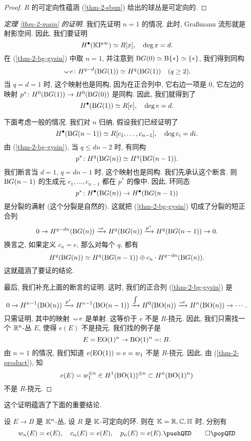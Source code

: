 \begin{proof}
    $R$ 的可定向性蕴涵 (\ref{thm-2-sbun}) 给出的球丛是可定向的.
\end{proof}

\begin{proof}[定理 \ref{thm-2-main} 的证明]
    我们先证明 $n = 1$ 的情况. 此时, Graßmann 流形就是射影空间. 因此, 我们要证明
    \[ H^\bullet (\mathbb{K} \mathrm{P}^\infty) \simeq R[x], \quad \deg x = d. \]
    在 (\ref{thm-2-bg-gysin}) 中取 $n = 1$,
    并注意到 $\mathrm{B} G(0) \simeq \mathrm{B} \{*\} \simeq \{*\}$, 我们得到同构
    \[ {} \smallcup e \: H^{q - d} (\upB G(1)) \simeq H^q (\upB G(1)) 
        \quad (q \geq 2). \]
    当 $q = d = 1$ 时, 这个映射也是同构,
    因为在正合列中, 它右边一项是 $0$,
    它左边的映射 $p^* \colon H^0(\mathrm{B} G(1)) \to H^0(\mathrm{B} G(0))$ 是同构.
    因此, 我们就得到了
    \[ H^\bullet(\mathrm{B} G(1)) \simeq R[e], \quad \deg e = d. \]

    下面考虑一般的情况. 我们对 $n$ 归纳, 假设我们已经证明了
    \[ H^\bullet (\mathrm{B} G(n-1)) \simeq R[c_1, \dotsc, c_{n-1}], \quad \deg c_i = di. \]
    由 (\ref{thm-2-bg-gysin}), 当 $q \leq dn - 2$ 时, 有同构
    \[ p^* \colon H^q (\mathrm{B} G(n)) \simeq H^q (\mathrm{B} G(n-1)). \]
    我们断言当 $d = 1$, $q = dn - 1$ 时, 这个映射也是同构.
    我们先承认这个断言. 则 $\mathrm{B} G(n-1)$ 的生成元 $c_1, \dotsc, c_{n-1}$
    都在 $p^*$ 的像中. 因此, 环同态
    \[ p^* \colon H^\bullet (\mathrm{B} G(n)) \to H^\bullet (\mathrm{B} G(n-1)) \]
    是分裂的满射 (这个分裂是自然的).
    这就把 (\ref{thm-2-bg-gysin}) 切成了分裂的短正合列
    \[ 0 \to H^{q - dn} (\upB G(n))
        \xrightarrow{\smallcup e} H^q (\upB G(n))
        \xrightarrow{p^*} H^q (\upB G(n - 1)) \to 0. \]
    换言之, 如果定义 $c_n = e$, 那么对每个 $q$, 都有
    \[ H^q(\mathrm{B} G(n)) \simeq
        H^q(\mathrm{B} G(n-1)) \oplus c_n \cdot H^{q - dn}(\mathrm{B} G(n)). \]
    这就蕴涵了要证的结论.

    最后, 我们补充上面的断言的证明. 这时, 我们的正合列 (\ref{thm-2-bg-gysin}) 是
    \[ 0 \to H^{n-1} (\upB\upO(n))
        \xrightarrow{p^*} H^{n-1} (\upB \upO (n-1))
        \xrightarrow{\int} H^0 (\upB \upO (n))
        \xrightarrow{\smallcup e} H^n (\upB \upO (n)) \to \cdots. \]
    只需证明, 其中的映射 ${} \smallcup e$ 是单射.
    这等价于 $e$ 不是 $R$-挠元.
    因此, 我们只需找一个 $\mathbb{R}^n$-丛 $E$, 使得 $e(E)$ 不是挠元.
    我们找的例子是
    \[ E = \mathrm{E} \mathrm{O} (1)^n \to \mathrm{B} \mathrm{O} (1)^n =: B. \]
    由 $n = 1$ 的情况, 我们知道 $e (\mathrm{E} \mathrm{O} (1)) = e = w_1$ 不是 $R$-挠元.
    因此, 由 (\ref{thm-2-product}), 知
    \[ e(E) = w_1^{\otimes n}
        \in H^1(\mathrm{B} \mathrm{O} (1))^{\otimes n}
        \subset H^n(\mathrm{B} \mathrm{O} (1)^n)\]
    不是 $R$-挠元.
\end{proof}

这个证明蕴涵了下面的重要结论.

\begin{corollary} \label{thm-2-top-equals-euler}
    设 $E \to B$ 是 $\mathbb{K}^n$-丛, 设 $R$ 是 $\mathbb{K}$-可定向的环.
    则在 $\mathbb{K} = \mathbb{R}, \mathbb{C}, \mathbb{H}$ 时, 分别有
    \[ w_n(E) = e(E), \quad
        c_n(E) = e(E), \quad
        p_n(E) = e(E). \thmqedhere \]
\end{corollary}

